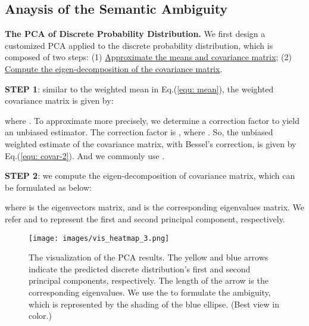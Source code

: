 \documentclass[10pt,twocolumn,letterpaper]{article}
\begin{document}
\subsection{Anaysis of the Semantic Ambiguity}
\noindent\textbf{The PCA of Discrete Probability Distribution.}
We first design a customized PCA applied to the discrete probability distribution, which is composed of two steps:
(1) \uline{Approximate the means and  covariance matrix};
(2) \uline{Compute the eigen-decomposition of the covariance matrix}.

\textbf{STEP 1}: similar to the weighted mean in Eq.(\ref{equ: mean}), the weighted covariance matrix is given by:

where . 
To approximate more precisely, we determine a correction factor to yield an unbiased estimator. 
The correction factor is , where .
So, the unbiased weighted estimate of the covariance matrix, with Bessel's correction, is given by Eq.(\ref{equ: covar-2}). 
And we commonly use . 


\textbf{STEP 2}: we compute the eigen-decomposition of covariance matrix, which can be formulated as below:

where  is the eigenvectors matrix, and  is the corresponding eigenvalues matrix.
We refer  and  to represent the first and second principal component, respectively.

\begin{figure}[t]
    \centering
    \texttt{[image: images/vis\_heatmap\_3.png]}
    \caption{
    The visualization of the PCA results. 
    The yellow and blue arrows indicate the predicted discrete distribution's first and second principal components, respectively.
    The length of the arrow is the corresponding eigenvalues. 
    We use the  to formulate the ambiguity, which is represented by the shading of the blue ellipse. (Best view in color.)}
    \vspace{-0.5em}
    \label{fig: vis_heatmap}
\end{figure}
\end{document}
